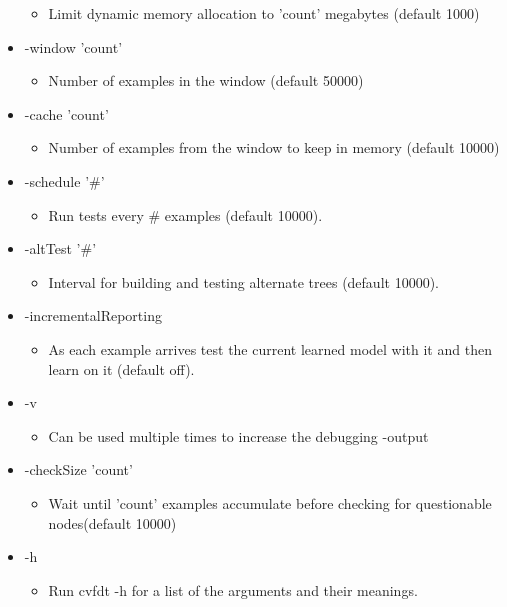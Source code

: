 \begin{itemize}
\begin{itemize}
\item Limit dynamic memory allocation to 'count' megabytes (default 1000)\end{itemize}
\item -window 'count'\begin{itemize}
\item Number of examples in the window (default 50000)\end{itemize}
\item -cache 'count'\begin{itemize}
\item Number of examples from the window to keep in memory (default 10000)\end{itemize}
\item -schedule '\#'\begin{itemize}
\item Run tests every \# examples (default 10000).\end{itemize}
\item -alt\-Test '\#'\begin{itemize}
\item Interval for building and testing alternate trees (default 10000).\end{itemize}
\item -incremental\-Reporting\begin{itemize}
\item As each example arrives test the current learned model with it and then learn on it (default off).\end{itemize}
\item -v\begin{itemize}
\item Can be used multiple times to increase the debugging -output\end{itemize}
\item -check\-Size 'count'\begin{itemize}
\item Wait until 'count' examples accumulate before checking for questionable nodes(default 10000)\end{itemize}
\item -h\begin{itemize}
\item Run cvfdt -h for a list of the arguments and their meanings.\end{itemize}
\end{itemize}


